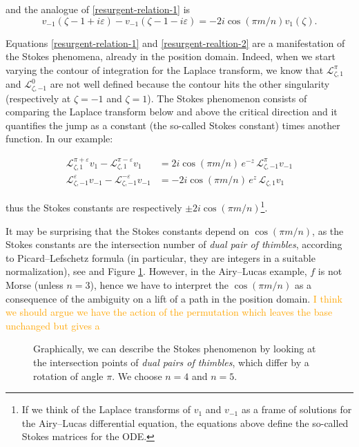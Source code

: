 \documentclass{article}
\theoremstyle{definition}
\newcommand{\laplace}{\mathcal{L}}
\begin{document}
and the analogue of \eqref{resurgent-relation-1} is 
\begin{equation}\label{resurgent-realtion-2}
    v_{-1}(\zeta-1+i\varepsilon)-v_{-1}(\zeta-1-i\varepsilon)= -2i\cos(\pi m/n) v_1(\zeta).
\end{equation}


Equations \eqref{resurgent-relation-1} and \eqref{resurgent-realtion-2} are a manifestation of the Stokes phenomena, already in the position domain. Indeed, when we start varying the contour of integration for the Laplace transform, we know that $\laplace_{\zeta,1}^\pi$ and $\laplace_{\zeta,-1}^0$ are not well defined because the contour hits the other singularity (respectively at $\zeta=-1$ and $\zeta=1$). The Stokes phenomenon consists of comparing the Laplace transform below and above the critical direction and it quantifies the jump as a constant (the so-called Stokes constant) times another function. In our example:

\begin{align*}
    \laplace_{\zeta,1}^{\pi+\varepsilon} v_1-\laplace_{\zeta,1}^{\pi-\varepsilon} v_1 & = 2 i \cos(\pi m/n) \, e^{-z}\, \laplace_{\zeta,-1}^{\pi} v_{-1} \\
    \laplace_{\zeta,-1}^{\varepsilon} v_{-1}-\laplace_{\zeta,-1}^{-\varepsilon} v_{-1} & = - 2 i \cos(\pi m/n)  \, e^z \, \laplace_{\zeta,1} v_{1} 
\end{align*}

thus the Stokes constants are respectively $\pm 2i \cos(\pi m/n)$\footnote{If we think of the Laplace transforms of $v_1$ and $v_{-1}$ as a frame of solutions for the Airy--Lucas differential equation, the equations above define the so-called Stokes matrices for the ODE.}. 

It may be surprising that the Stokes constants depend on $\cos(\pi m/n)$, as the Stokes constants are the intersection number of \textit{dual pair of thimbles}, according to Picard--Lefschetz formula (in particular, they are integers in a suitable normalization), see \cite[Section 5]{pham} and Figure \ref{fig:intersection_thimbles}. However, in the Airy--Lucas example, $f$ is not Morse (unless $n=3$), hence we have to interpret the $\cos(\pi m/n)$ as a consequence of the ambiguity on a lift of a path in the position domain. \textcolor{orange}{ I think we should argue we have the action of the permutation which leaves the base unchanged but gives a } 

\begin{figure}[h]
    \centering
    \caption{Graphically, we can describe the Stokes phenomenon by looking at the intersection points of \textit{dual pairs of thimbles}, which differ by a rotation of angle $\pi$. We choose $n=4$ and $n=5$. }
    \label{fig:intersection_thimbles}
\end{figure}
\end{document}

